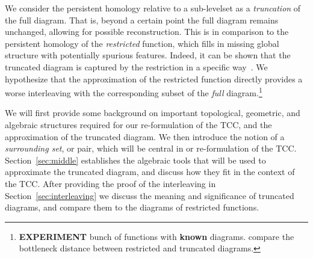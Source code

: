 We consider the persistent homology relative to a sub-levelset as a \emph{truncation} of the full diagram.
That is, beyond a certain point the full diagram remains unchanged, allowing for possible reconstruction.
This is in comparison to the persistent homology of the \emph{restricted} function, which fills in missing global structure with potentially spurious features.
Indeed, it can be shown that the truncated diagram is captured by the restriction in a specific way~\cite{extendedpersistence}.
We hypothesize that the approximation of the restricted function directly provides a worse interleaving with the corresponding subset of the \emph{full} diagram.\footnote{\textbf{EXPERIMENT} bunch of functions with \textbf{known} diagrams. compare the bottleneck distance between restricted and truncated diagrams.}

We will first provide some background on important topological, geometric, and algebraic structures required for our re-formulation of the TCC, and the approximation of the truncated diagram.
We then introduce the notion of a \emph{surrounding set}, or pair, which will be central in or re-formulation of the TCC.
Section~\ref{sec:middle} establishes the algebraic tools that will be used to approximate the truncated diagram, and discuss how they fit in the context of the TCC.
After providing the proof of the interleaving in Section~\ref{sec:interleaving} we discuss the meaning and significance of truncated diagrams, and compare them to the diagrams of restricted functions.



